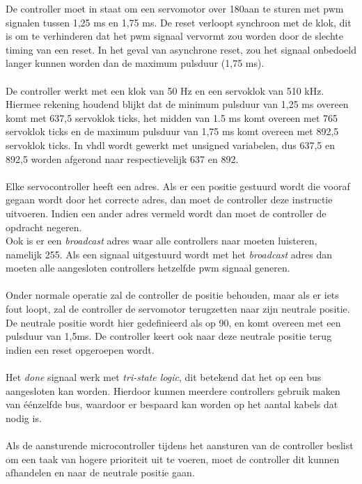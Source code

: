 De controller moet in staat om een servomotor over 180\textdegree \space aan te sturen met \gls{pwm} signalen tussen 1,25 ms en 1,75 ms. De reset verloopt synchroon met de klok, dit is om te verhinderen dat het \gls{pwm} signaal vervormt zou worden door de slechte timing van een reset. In het geval van asynchrone reset, zou het  signaal onbedoeld langer kunnen worden dan de maximum pulsduur (1,75 ms).\\
\\
De controller werkt met een klok van 50 Hz en een servoklok van 510 kHz. Hiermee rekening houdend blijkt dat de minimum pulsduur van 1,25 ms overeen komt met 637,5 servoklok ticks, het midden van 1.5 ms komt overeen met 765 servoklok ticks en de maximum pulsduur van 1,75 ms komt overeen met 892,5 servoklok ticks. In \gls{vhdl} wordt gewerkt met unsigned variabelen, dus 637,5 en 892,5 worden afgerond naar respectievelijk 637 en 892.\\
\\
Elke servocontroller heeft een adres. Als er een positie gestuurd wordt die vooraf gegaan wordt door het correcte adres, dan moet de controller deze instructie uitvoeren. Indien een ander adres vermeld wordt dan moet de controller de opdracht negeren.\\
Ook is er een \textit{broadcast} adres waar alle controllers  naar moeten luisteren, namelijk 255. Als een signaal uitgestuurd wordt met het \textit{broadcast} adres dan moeten alle aangesloten controllers hetzelfde \gls{pwm} signaal generen.\\
\\
Onder normale operatie zal de controller de positie behouden, maar als er iets fout loopt, zal de controller de servomotor terugzetten naar zijn neutrale positie. De neutrale positie wordt hier gedefinieerd als op 90\textdegree, en komt overeen met een pulsduur van 1,5ms. De controller keert ook naar deze neutrale positie terug indien een reset opgeroepen wordt.\\
\\
Het \textit{done} signaal werk met \textit{tri-state logic}, dit betekend dat het op een bus aangesloten kan worden. Hierdoor kunnen meerdere controllers gebruik maken van \'{e}\'{e}nzelfde bus, waardoor er bespaard kan worden op het aantal kabels dat nodig is.\\
\\
Als de aansturende microcontroller tijdens het aansturen van de controller beslist om een taak van hogere prioriteit uit te voeren, moet de controller dit kunnen afhandelen en naar de neutrale positie gaan.\\

